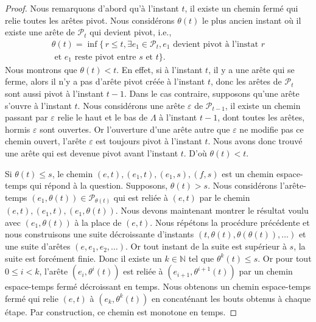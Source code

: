 \documentclass[titlepage,a4paper,12pt]{article}
\newcounter{th}
\begin{document}
\begin{proof}
Nous remarquons d'abord qu'à l'instant $t$, il existe un chemin fermé qui relie toutes les arêtes pivot. Nous considérons $\theta(t)$ le plus ancien instant où il existe une arête de $\mathcal{P}_t$ qui devient pivot, i.e.,
\begin{multline*} \theta(t) = \inf\big\{ \,r\leqslant t, \exists e_1 \in \mathcal{P}_t, e_1 \text{ devient pivot à l'instat } r \\\text{ et }e_1\text{ reste pivot entre }s\text{ et }t \big\}.
\end{multline*}
Nous montrons que $\theta(t)< t$. En effet, si à l'instant $t$, il y a une arête qui se ferme, alors il n'y a pas d'arête pivot créée à l'instant $t$, donc les arêtes de $\mathcal{P}_t$ sont aussi pivot à l'instant $t-1$. Dans le cas contraire, supposons qu'une arête s'ouvre à l'instant $t$. Nous considérons une arête $\varepsilon$ de $\mathcal{P}_{t-1}$, il existe un chemin passant par $\varepsilon$ relie le haut et le bas de $\Lambda$ à l'instant $t-1$, dont toutes les arêtes, hormis $\varepsilon$ sont ouvertes. Or l'ouverture d'une arête autre que $\varepsilon$ ne modifie pas ce chemin ouvert, l'arête $\varepsilon$ est toujours pivot à l'instant $t$. Nous avons donc trouvé une arête qui est devenue pivot avant l'instant $t$. D'où $\theta(t)< t$.

Si $\theta(t)\leqslant s$, le chemin $(e,t),(e_1,t),(e_1,s),(f,s)$ est un chemin espace-temps qui répond à la question. Supposons, $\theta(t)> s$. Nous considérons l'arête-temps $(e_1,\theta(t))\in \mathcal{P}_{\theta(t)}$ qui est reliée à $(e,t)$ par le chemin $(e,t),(e_1,t),(e_1,\theta(t))$. Nous devons maintenant montrer le résultat voulu avec $(e_1,\theta(t))$ à la place de $(e,t)$. Nous répétons la procédure précédente et nous construisons une suite décroissante d'instants $(t,\theta(t),\theta(\theta(t)),\dots)$ et une suite d'arêtes $(e,e_1,e_2,\dots)$. Or tout instant de la suite est supérieur à $s$, la suite est forcément finie. Donc il existe un $k\in\mathbb{N}$ tel que $\theta^k(t)\leqslant s$. Or pour tout $0\leqslant i < k$, l'arête $(e_i,\theta^i(t))$ est reliée à $(e_{i+1},\theta^{i+1}(t))$ par un chemin espace-temps fermé décroissant en temps. Nous obtenons un chemin espace-temps fermé qui relie $(e,t)$ à $(e_k,\theta^k(t))$ en concaténant les bouts obtenus à chaque étape. Par construction, ce chemin est monotone en temps. 


\end{proof}
\end{document}
